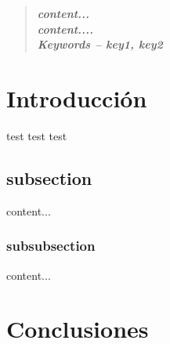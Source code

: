 \documentclass[ %
	Article, %
	PageType=empty, %
	FontSize=10pt
]{../../Preamble/UMSAetn}
\begin{document}
	\myMaketitle
	\begin{abstract}\bf\textit{
		content... \\ \linebreak
		content.... \\ \linebreak
		Keywords -- key1, key2 
		}
	\end{abstract}
	\section{Introducción}
	test test test
	\subsection{subsection}
		content... \cite{F.2012}
 
	\subsubsection{subsubsection}
		content... 
	\section{Conclusiones}	
		
	\printbibliography
	\nocite{*}
\end{document}
